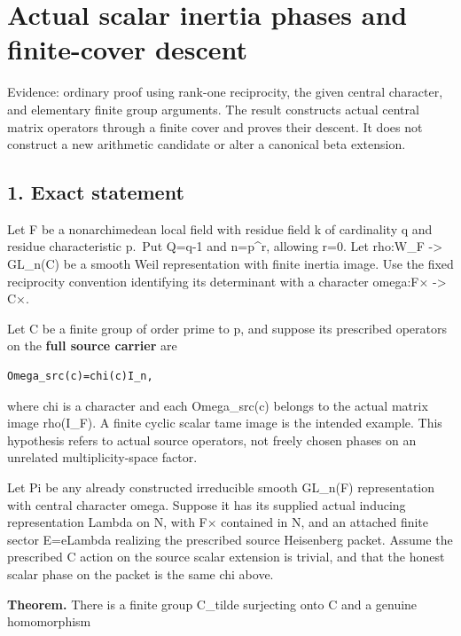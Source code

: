 \clearpage
\section{Actual scalar inertia phases and finite-cover descent}\label{app:odd_scalar}

Evidence: ordinary proof using rank-one reciprocity, the given central
character, and elementary finite group arguments. The result constructs
actual central matrix operators through a finite cover and proves their
descent. It does not construct a new arithmetic candidate or alter a
canonical beta extension.

\hypertarget{odd_scalar-exact-statement}{%
\subsection{1. Exact statement}\label{odd_scalar-exact-statement}}

Let F be a nonarchimedean local field with residue field k of
cardinality q and residue characteristic p.~Put Q=q-1 and n=p\^{}r,
allowing r=0. Let rho:W\_F -\textgreater{} GL\_n(C) be a smooth Weil
representation with finite inertia image. Use the fixed reciprocity
convention identifying its determinant with a character omega:F×
-\textgreater{} C×.

Let C be a finite group of order prime to p, and suppose its prescribed
operators on the \textbf{full source carrier} are

\begin{Verbatim}[fontsize=\small,breaklines=true,breakanywhere=true]
Omega_src(c)=chi(c)I_n,
\end{Verbatim}

where chi is a character and each Omega\_src(c) belongs to the actual
matrix image rho(I\_F). A finite cyclic scalar tame image is the
intended example. This hypothesis refers to actual source operators, not
freely chosen phases on an unrelated multiplicity-space factor.

Let Pi be any already constructed irreducible smooth GL\_n(F)
representation with central character omega. Suppose it has its supplied
actual inducing representation Lambda on N, with F× contained in N, and
an attached finite sector E=eLambda realizing the prescribed source
Heisenberg packet. Assume the prescribed C action on the source scalar
extension is trivial, and that the honest scalar phase on the packet is
the same chi above.

\textbf{Theorem.} There is a finite group C\_tilde surjecting onto C and
a genuine homomorphism

